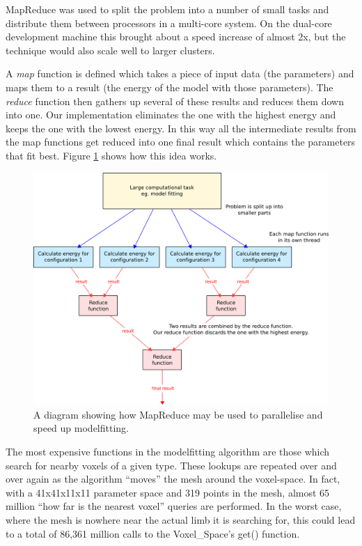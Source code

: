 \documentclass[a4paper,12pt]{article}
\begin{document}
MapReduce \cite{MapReduce} was used to split the problem into a number of small tasks and distribute them between processors in a multi-core system.
On the dual-core development machine this brought about a speed increase of almost 2x, but the technique would also scale well to larger clusters.

A \emph{map} function is defined which takes a piece of input data (the parameters) and maps them to a result (the energy of the model with those parameters).
The \emph{reduce} function then gathers up several of these results and reduces them down into one.
Our implementation eliminates the one with the highest energy and keeps the one with the lowest energy.
In this way all the intermediate results from the map functions get reduced into one final result which contains the parameters that fit best.
Figure \ref{MapReduceDiagram} shows how this idea works.

\begin{figure}[bt]
	\centering
	\includegraphics[width=\textwidth]{../report/mapreduce.png}
	\caption{A diagram showing how MapReduce may be used to parallelise and speed up modelfitting.}
	\label{MapReduceDiagram}
\end{figure}

\bigskip
The most expensive functions in the modelfitting algorithm are those which search for nearby voxels of a given type.
These lookups are repeated over and over again as the algorithm ``moves'' the mesh around the voxel-space.
In fact, with a 41x41x11x11 parameter space and 319 points in the mesh, almost 65 million ``how far is the nearest voxel'' queries are performed.
In the worst case, where the mesh is nowhere near the actual limb it is searching for, this could lead to a total of 86,361 million calls to the Voxel\_Space's get() function.
\end{document}
